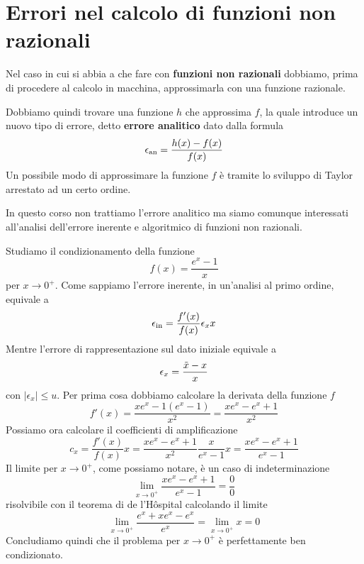 \section{Errori nel calcolo di funzioni non razionali}
Nel caso in cui si abbia a che fare con \textbf{funzioni non razionali} dobbiamo, prima di procedere al
calcolo in macchina, approssimarla con una funzione razionale.

Dobbiamo quindi trovare una funzione $h$ che approssima $f$, la quale introduce un nuovo tipo di errore, detto
\textbf{errore analitico} dato dalla formula
\[ \epsilon_\text{an} = \frac{h(x) - f(x)}{f(x)} \]
Un possibile modo di approssimare la funzione $f$ è tramite lo sviluppo di Taylor arrestato ad un certo ordine.

In questo corso non trattiamo l'errore analitico ma siamo comunque interessati all'analisi dell'errore inerente
e algoritmico di funzioni non razionali.

\begin{example}
	Studiamo il condizionamento della funzione
	\[ f(x) = \frac{e^x - 1}{x} \]
	per $x \to 0^+$. Come sappiamo l'errore inerente, in un'analisi al primo ordine, equivale a
	\[ \epsilon_\text{in} = \frac{f'(x)}{f(x)} \epsilon_x x \]
	Mentre l'errore di rappresentazione sul dato iniziale equivale a
	\[ \epsilon_x = \frac{\tilde{x} - x}{x} \]
	con $|\epsilon_x| \leq u$. Per prima cosa dobbiamo calcolare la derivata della funzione $f$
	\[ f'(x) = \frac{x e^x - 1 (e^x - 1)}{x^2} = \frac{x e^x - e^x + 1}{x^2} \]
	Possiamo ora calcolare il coefficienti di amplificazione
	\[
		c_x = \frac{f'(x)}{f(x)} x =
		\frac{x e^x - e^x + 1}{x^2} \frac{x}{e^x - 1} x =
		\frac{x e^x - e^x + 1}{e^x - 1}
	\]
	Il limite per $x \to 0^+$, come possiamo notare, è un caso di indeterminazione
	\[ \lim_{x \to 0^+} \frac{x e^x - e^x + 1}{e^x - 1} = \frac{0}{0} \]
	risolvibile con il teorema di de l'H\^ospital calcolando il limite
	\[ \lim_{x \to 0^+} \frac{e^x + x e^x - e^x}{e^x} = \lim_{x \to 0^+} x = 0 \]
	Concludiamo quindi che il problema per $x \to 0^+$ è perfettamente ben condizionato.
\end{example}

